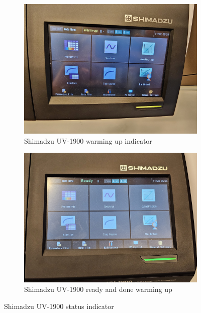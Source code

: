 \documentclass{article}
\begin{document}
\begin{figure}[H]
    \centering
    \begin{subfigure}[b]{0.48\textwidth}
        \centering
        \includegraphics[width=\textwidth]{shimadzu_heating.jpg}
        \caption{Shimadzu UV-1900 warming up indicator}
        \label{fig:shimadzu_heating}
    \end{subfigure}
    \hfill
    \begin{subfigure}[b]{0.48\textwidth}
       \centering 
       \includegraphics[width=\textwidth]{shimadzu_ready.jpg}
       \caption{Shimadzu UV-1900 ready and done warming up}
       \label{fig:shimadzu_ready}
    \end{subfigure}
    \caption{Shimadzu UV-1900 status indicator}
    \label{fig:shimadzu_status}
\end{figure}
\end{document}
